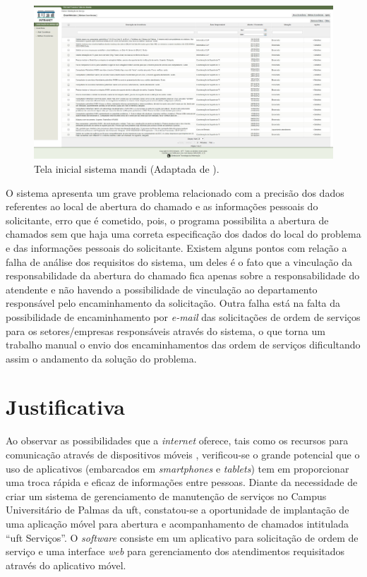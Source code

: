 \begin{figure}[!h]
  \centering
  \includegraphics[width=1\textwidth]{figuras/tela-inicial-mandi.jpg}
  \caption{Tela inicial sistema \acrshort{mandi} (Adaptada de \cite{intranet_uft}).}
  \label{fig-mandi-uft} 
\end{figure}

O sistema apresenta um grave problema relacionado com a precisão dos dados referentes ao local de abertura do chamado e as informações pessoais do solicitante, erro que é cometido, pois, o programa possibilita a abertura de chamados sem que haja uma correta especificação dos dados do local do problema e das informações pessoais do solicitante. 
Existem alguns pontos com relação a falha de análise dos requisitos do sistema, um deles é o fato que a vinculação da responsabilidade da abertura do chamado fica apenas sobre a responsabilidade do atendente e não havendo a possibilidade de vinculação ao departamento responsável pelo encaminhamento da solicitação. Outra falha está na falta da possibilidade de encaminhamento por \textit{e-mail} das solicitações de ordem de serviços para os setores/empresas responsáveis através do sistema, o que torna um trabalho manual o envio dos encaminhamentos das ordem de serviços dificultando assim o andamento da solução do problema.

\section{Justificativa}

\noindent Ao observar as possibilidades que a \textit{internet} oferece, tais como os recursos para comunicação através de dispositivos móveis \cite{pesquisa-fgv}, verificou-se o grande potencial que o uso de aplicativos (embarcados em \textit{smartphones} e \textit{tablets}) tem em proporcionar uma troca rápida e eficaz de informações entre pessoas.
Diante da necessidade de criar um sistema de gerenciamento de manutenção de serviços no Campus Universitário de Palmas da \acrshort{uft}, constatou-se a oportunidade de implantação de uma aplicação móvel para abertura e acompanhamento de chamados intitulada ``\acrshort{uft} Serviços''. O \textit{software} consiste em um aplicativo para solicitação de ordem de serviço e uma interface \textit{web} para gerenciamento dos atendimentos requisitados através do aplicativo móvel.

